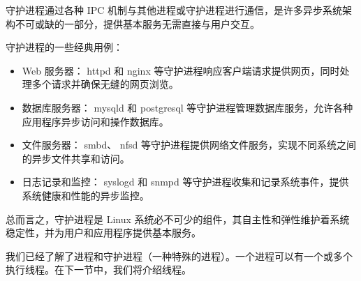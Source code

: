 守护进程通过各种 IPC 机制与其他进程或守护进程进行通信，是许多异步系统架构不可或缺的一部分，提供基本服务无需直接与用户交互。

守护进程的一些经典用例：

\begin{itemize}
\item
Web 服务器： httpd 和 nginx 等守护进程响应客户端请求提供网页，同时处理多个请求并确保无缝的网页浏览。

\item
数据库服务器： mysqld 和 postgresql 等守护进程管理数据库服务，允许各种应用程序异步访问和操作数据库。

\item
文件服务器： smbd、 nfsd 等守护进程提供网络文件服务，实现不同系统之间的异步文件共享和访问。

\item
日志记录和监控： syslogd 和 snmpd 等守护进程收集和记录系统事件，提供系统健康和性能的异步监控。
\end{itemize}

总而言之，守护进程是 Linux 系统必不可少的组件，其自主性和弹性维护着系统稳定性，并为用户和应用程序提供基本服务。

我们已经了解了进程和守护进程（一种特殊的进程）。一个进程可以有一个或多个执行线程。在下一节中，我们将介绍线程。






